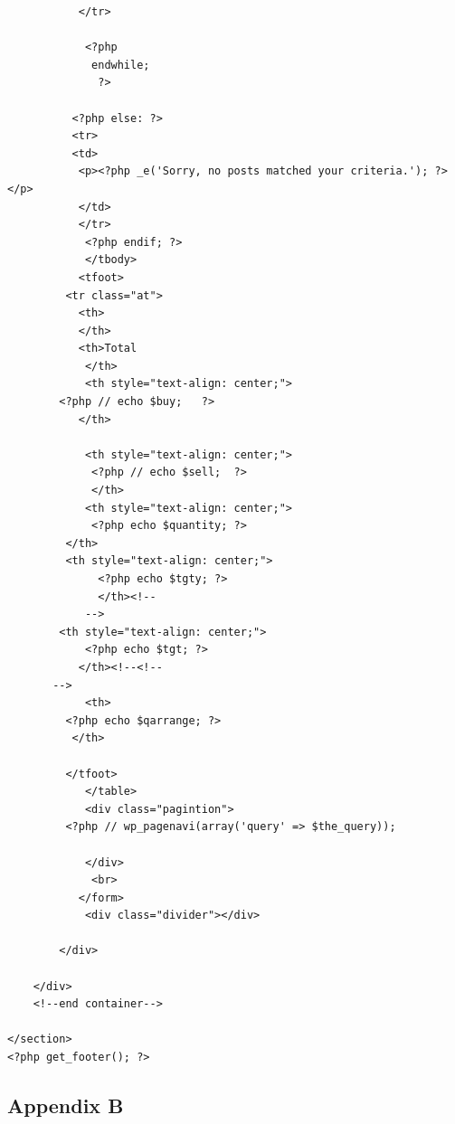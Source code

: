 \documentclass[a4paper,12pt]{article}
\begin{document}
\begin{verbatim}
           </tr>

            <?php
             endwhile;
              ?>

          <?php else: ?>
          <tr>
          <td>                 
           <p><?php _e('Sorry, no posts matched your criteria.'); ?></p>
           </td>
           </tr>
            <?php endif; ?>
            </tbody>
           <tfoot>
         <tr class="at"> 
           <th>
           </th>
           <th>Total
            </th>
            <th style="text-align: center;">     
        <?php // echo $buy;   ?>
           </th>

            <th style="text-align: center;">
             <?php // echo $sell;  ?>
             </th>
            <th style="text-align: center;">
             <?php echo $quantity; ?>
         </th>
         <th style="text-align: center;">
              <?php echo $tgty; ?>
              </th><!--
            -->                                
        <th style="text-align: center;">
            <?php echo $tgt; ?>
           </th><!--<!--
       -->             
            <th>
         <?php echo $qarrange; ?>
          </th>
        
         </tfoot>
            </table>
            <div class="pagintion">
         <?php // wp_pagenavi(array('query' => $the_query));
             
            </div> 
             <br>
           </form>
            <div class="divider"></div> 

        </div>

    </div>
    <!--end container-->

</section>
<?php get_footer(); ?>
\end{verbatim}
\newpage
\subsection{Appendix B}\vspace{5mm}
\end{document}
